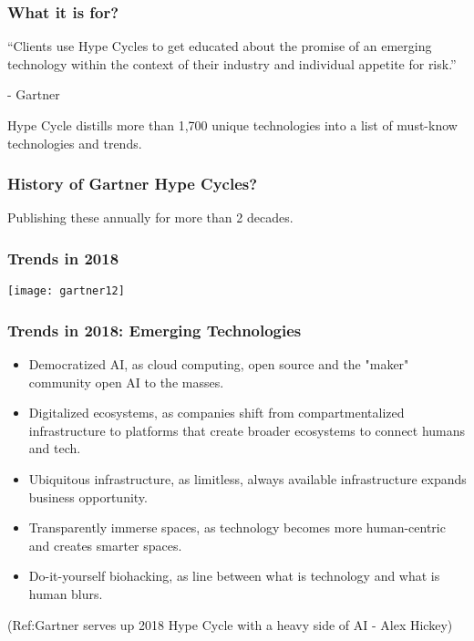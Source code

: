\begin{frame}[fragile]\frametitle{What it is for?}

``Clients use Hype Cycles to get educated about the promise of an emerging technology within the context of their industry and individual appetite for risk.''

- Gartner 

Hype Cycle distills more than 1,700 unique technologies into a list of must-know technologies and trends.

\end{frame}

\begin{frame}[fragile]\frametitle{History of Gartner Hype Cycles?}

Publishing these annually for more than 2 decades.

\end{frame}

\begin{frame}[fragile]\frametitle{Trends in 2018}

\begin{center}
\texttt{[image: gartner12]}
\end{center}


\end{frame}

\begin{frame}[fragile]\frametitle{Trends in 2018: Emerging Technologies}
\begin{itemize}
\item Democratized AI, as cloud computing, open source and the "maker" community open AI to the masses.

\item Digitalized ecosystems, as companies shift from compartmentalized infrastructure to platforms that create broader ecosystems to connect humans and tech.

\item Ubiquitous infrastructure, as limitless, always available infrastructure expands business opportunity.

\item Transparently immerse spaces, as technology becomes more human-centric and creates smarter spaces.

\item Do-it-yourself biohacking, as line between what is technology and what is human blurs.

\end{itemize}


{\tiny (Ref:Gartner serves up 2018 Hype Cycle with a heavy side of AI - Alex Hickey)}

\end{frame}

